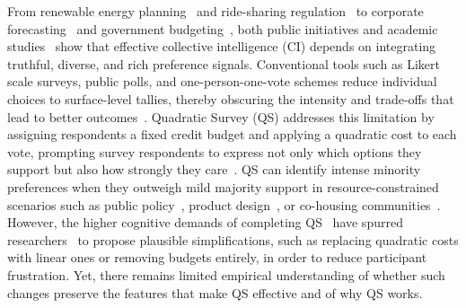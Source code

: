 From renewable energy planning~\cite{fishkinConsultingPublicDeliberative2003} and ride-sharing regulation~\cite{hsiao2018vtaiwan} to corporate forecasting~\cite{cowgill2015corporate} and government budgeting~\cite{desousasantosParticipatoryBudgetingPorto1998}, both public initiatives and academic studies~\cite{woolley2010evidence, centola2022network, krosnick1999survey, weylPluralityFutureCollaborative2024} show that effective collective intelligence (CI) depends on integrating truthful, diverse, and rich preference signals. Conventional tools such as Likert scale surveys, public polls, and one-person-one-vote schemes reduce individual choices to surface-level tallies, thereby obscuring the intensity and trade-offs that lead to better outcomes~\cite{quarfoot2017quadratic,posner2017quadratic, krosnick1999survey}. Quadratic Survey (QS) addresses this limitation by assigning respondents a fixed credit budget and applying a quadratic cost to each vote, prompting survey respondents to express not only which options they support but also how strongly they care~\cite{chengCanShowWhat2021, quarfoot2017quadratic, cavaille2024cares}. QS can identify intense minority preferences when they outweigh mild majority support in resource-constrained scenarios such as public policy~\cite{chengCanShowWhat2021, quarfoot2017quadratic}, product design~\cite{chengCanShowWhat2021}, or co-housing communities~\cite{karpinskiPotentialQuadraticVoting2025}. However, the higher cognitive demands of completing QS~\cite{chengOrganizeThenVote2025} have spurred researchers~\cite{cavaille2024cares, chengCanShowWhat2021} to propose plausible simplifications, such as replacing quadratic costs with linear ones or removing budgets entirely, in order to reduce participant frustration. Yet, there remains limited empirical understanding of whether such changes preserve the features that make QS effective and of why QS works.


